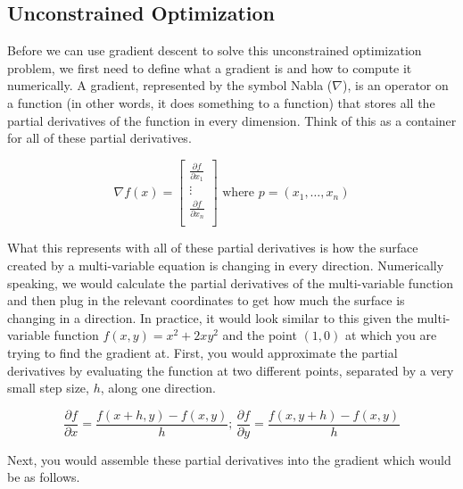 \documentclass[10pt,letterpaper,onecolumn,report]{tau-class/tau}
\begin{document}
    \subsection{Unconstrained Optimization}

        Before we can use gradient descent to solve this unconstrained optimization problem, we first need to define what a gradient is and how to compute it numerically. A gradient, represented by the symbol Nabla (\(\nabla\)), is an operator on a function (in other words, it does something to a function) that stores all the partial derivatives of the function in every dimension. Think of this as a container for all of these partial derivatives.

        \begin{equation}
            \nabla f(x) = 
            \begin{bmatrix}
                \frac {\partial f} {\partial x_1} \\
                \vdots \\
                \frac {\partial f} {\partial x_n} \\
            \end{bmatrix}
            \text{ where } p = (x_1, \ldots, x_n)
        \end{equation}

        What this represents with all of these partial derivatives is how the surface created by a multi-variable equation is changing in every direction. Numerically speaking, we would calculate the partial derivatives of the multi-variable function and then plug in the relevant coordinates to get how much the surface is changing in a direction. In practice, it would look similar to this given the multi-variable function \(f(x,y) = x^2 + 2xy^2\) and the point \((1, 0)\) at which you are trying to find the gradient at. First, you would approximate the partial derivatives by evaluating the function at two different points, separated by a very small step size, \(h\), along one direction.

        \begin{equation}
            \frac {\partial f} {\partial x} = \frac {f(x + h, y) - f(x, y)} {h} \text{; } \frac{\partial f}{\partial y} = \frac{f(x, y + h) - f(x, y)}{h}
        \end{equation}

        Next, you would assemble these partial derivatives into the gradient which would be as follows.
\end{document}
